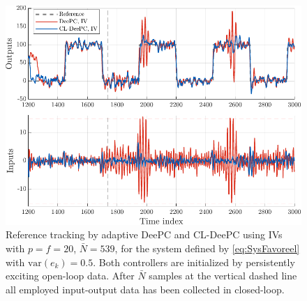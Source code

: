 \begin{figure}
\begin{center}
\includegraphics[width=\columnwidth]{results/figures/fig_prob_sol.pdf}    %
\caption{Reference tracking by adaptive \ac{DeePC} and \ac{CL-DeePC} using \ac{IVs} with $p=f=20$, $\bar{N}=539$,  for the system defined by \eqref{eq:SysFavoreel} with $\text{var}(e_k)=0.5$. Both controllers are initialized by persistently exciting open-loop data. After $\bar{N}$ samples at the vertical dashed line all employed input-output data has been collected in closed-loop.}  %
\label{fig:CL_Problem_Solution}                                 %
\end{center}                                 %
\end{figure}
